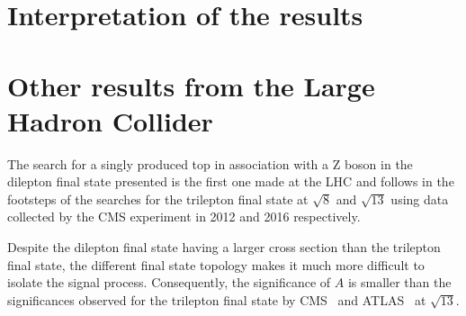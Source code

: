 \section{Interpretation of the results}

\section{Other results from the Large Hadron Collider}
The search for a singly produced top in association with a Z boson in the dilepton final state presented is the first one made at the LHC and follows in the footsteps of the searches for the trilepton final state at $\sqrt{8}$ and $\sqrt{13}$ using data collected by the CMS experiment in 2012 and 2016 respectively.

Despite the dilepton final state having a larger cross section than the trilepton final state, the different final state topology makes it much more difficult to isolate the signal process.
Consequently, the  significance of $A$ is smaller than the significances observed for the trilepton final state by CMS~\cite{Sirunyan:2017nbr} and ATLAS~\cite{Aaboud:2017ylb} at $\sqrt{13}$.

